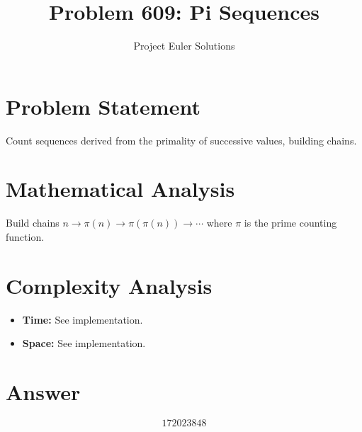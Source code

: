 \documentclass[11pt]{article}
\title{Problem 609: Pi Sequences}
\author{Project Euler Solutions}
\date{}
\begin{document}
\maketitle

\section{Problem Statement}
Count sequences derived from the primality of successive values, building chains.

\section{Mathematical Analysis}
Build chains $n \to \pi(n) \to \pi(\pi(n)) \to \cdots$ where $\pi$ is the prime counting function.

\section{Complexity Analysis}
\begin{itemize}
    \item \textbf{Time:} See implementation.
    \item \textbf{Space:} See implementation.
\end{itemize}

\section{Answer}

\[
\boxed{172023848}
\]
\end{document}
